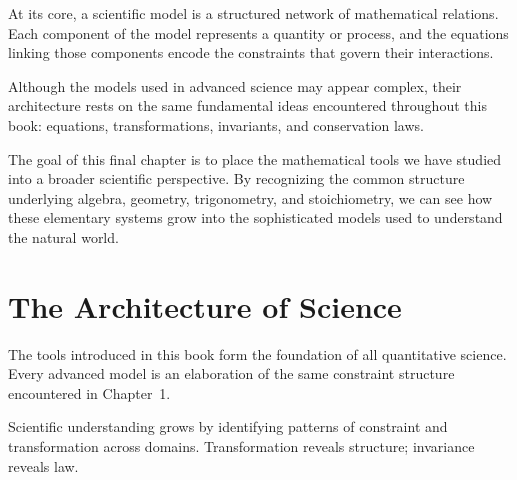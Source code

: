 \documentclass[11pt, openany]{book}
\theoremstyle{plain}
\theoremstyle{definition}
\theoremstyle{remark}
\begin{document}
At its core, a scientific model is a structured network of mathematical
relations. Each component of the model represents a quantity or process,
and the equations linking those components encode the constraints that
govern their interactions.

Although the models used in advanced science may appear complex, their
architecture rests on the same fundamental ideas encountered throughout
this book: equations, transformations, invariants, and conservation
laws.

\medskip

The goal of this final chapter is to place the mathematical tools we have
studied into a broader scientific perspective. By recognizing the common
structure underlying algebra, geometry, trigonometry, and stoichiometry,
we can see how these elementary systems grow into the sophisticated
models used to understand the natural world.

\section{The Architecture of Science}

The tools introduced in this book form the foundation of all quantitative
science. Every advanced model is an elaboration of the same constraint
structure encountered in Chapter~1.

\begin{center}
\end{center}

\begin{principle}
Scientific understanding grows by identifying patterns of constraint and
transformation across domains. Transformation reveals structure; invariance
reveals law.
\end{principle}
\end{document}
